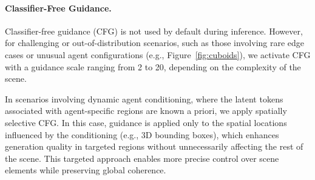 \paragraph{Classifier-Free Guidance.}
Classifier-free guidance (CFG) is not used by default during inference. However, for challenging or out-of-distribution scenarios, such as those involving rare edge cases or unusual agent configurations (e.g., Figure~\ref{fig:cuboids}), we activate CFG with a guidance scale ranging from 2 to 20, depending on the complexity of the scene.

In scenarios involving dynamic agent conditioning, where the latent tokens associated with agent-specific regions are known a priori, we apply spatially selective CFG. In this case, guidance is applied only to the spatial locations influenced by the conditioning (e.g., 3D bounding boxes), which enhances generation quality in targeted regions without unnecessarily affecting the rest of the scene. This targeted approach enables more precise control over scene elements while preserving global coherence.
